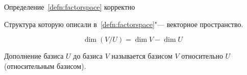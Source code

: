\documentclass[12pt]{../../notes}
\begin{document}
\begin{stat}\label{stat:corrfactspc}
  Определение~\ref{defn:factorspace} корректно
\end{stat}

\begin{stat}\label{stat:factspcISspace}
  Структура которую описали в~\ref{defn:factorspace}"--- векторное пространство.
\end{stat}

\begin{thrm}\label{thrm:dimfactspc}
  \[
    \dim (V/U) = \dim V - \dim U
  \]
\end{thrm}

\begin{defn}\label{defn:relbasis}
  Дополнение базиса $U$ до базиса $V$ называется базисом $V$ относительно $U$ (относительным
  базисом).
\end{defn}
\end{document}
